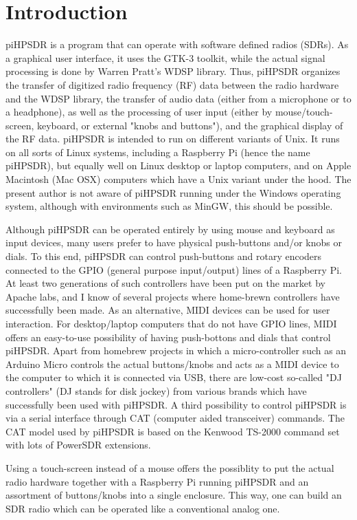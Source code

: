 \documentclass[12pt]{book}
\begin{document}
\tableofcontents
\mainmatter
\chapter{Introduction}
piHPSDR is a program that can operate with software defined radios (SDRs). As a graphical user interface,
it uses the GTK-3 toolkit, while the actual signal processing is done by Warren Pratt's WDSP library. Thus,
piHPSDR organizes the transfer of digitized radio frequency (RF) data between the radio hardware and the WDSP library, the
transfer of audio data (either from a microphone or to a headphone), as well as the processing of user
input (either by mouse/touch-screen, keyboard, or external "knobs and buttons"),
 and the graphical display of the RF data. piHPSDR is intended
to run on different variants of Unix. It runs on all sorts of Linux systems, including a Raspberry Pi (hence
the name piHPSDR), but equally well on Linux desktop or laptop computers, and on Apple Macintosh (Mac OSX)
computers which have a Unix variant under the hood. The present author is not aware of piHPSDR running
under the Windows operating system, although with environments such as MinGW, this should be possible.

Although piHPSDR can be operated entirely by using mouse and keyboard as input devices, many users prefer to
have physical push-buttons and/or knobs or dials. To this end, piHPSDR can control push-buttons and rotary
encoders connected to the GPIO (general purpose input/output)
lines of a Raspberry Pi. At least two generations of such controllers have
been put on the market by Apache labs, and I know of several projects where home-brewn controllers have
successfully been made. As an alternative, MIDI devices can be used for user interaction. For desktop/laptop
computers that do not have GPIO lines, MIDI offers an easy-to-use possibility of having push-bottons and
dials that control piHPSDR. Apart from homebrew projects in which a micro-controller such as an Arduino Micro
controls the actual buttons/knobs and acts as a MIDI device to the computer to which it is connected via USB,
there are low-cost so-called "DJ controllers" (DJ stands for disk jockey) from various brands which have
successfully been used with piHPSDR. A third possibility to control piHPSDR is via a serial interface
through CAT (computer aided transceiver) commands. The CAT model used by piHPSDR is based on the Kenwood
TS-2000 command set with lots of PowerSDR extensions.

Using a touch-screen instead of a mouse offers the possiblity to put the actual radio hardware together
with a Raspberry Pi running piHPSDR and an assortment of buttons/knobs into a single enclosure. This way,
one can build an SDR radio which can be operated like a conventional analog one.
\end{document}
